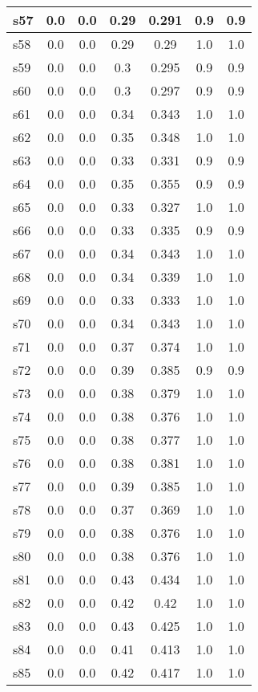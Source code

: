 \documentclass{article}
\begin{document}
\begin{tabular}{|l|c|c|c|c|c|c|}
\hline
s57 &0.0 & 0.0 & 0.29 & 0.291 & 0.9 & 0.9\\
\hline
s58 &0.0 & 0.0 & 0.29 & 0.29 & 1.0 & 1.0\\
\hline
s59 &0.0 & 0.0 & 0.3 & 0.295 & 0.9 & 0.9\\
\hline
s60 &0.0 & 0.0 & 0.3 & 0.297 & 0.9 & 0.9\\
\hline
s61 &0.0 & 0.0 & 0.34 & 0.343 & 1.0 & 1.0\\
\hline
s62 &0.0 & 0.0 & 0.35 & 0.348 & 1.0 & 1.0\\
\hline
s63 &0.0 & 0.0 & 0.33 & 0.331 & 0.9 & 0.9\\
\hline
s64 &0.0 & 0.0 & 0.35 & 0.355 & 0.9 & 0.9\\
\hline
s65 &0.0 & 0.0 & 0.33 & 0.327 & 1.0 & 1.0\\
\hline
s66 &0.0 & 0.0 & 0.33 & 0.335 & 0.9 & 0.9\\
\hline
s67 &0.0 & 0.0 & 0.34 & 0.343 & 1.0 & 1.0\\
\hline
s68 &0.0 & 0.0 & 0.34 & 0.339 & 1.0 & 1.0\\
\hline
s69 &0.0 & 0.0 & 0.33 & 0.333 & 1.0 & 1.0\\
\hline
s70 &0.0 & 0.0 & 0.34 & 0.343 & 1.0 & 1.0\\
\hline
s71 &0.0 & 0.0 & 0.37 & 0.374 & 1.0 & 1.0\\
\hline
s72 &0.0 & 0.0 & 0.39 & 0.385 & 0.9 & 0.9\\
\hline
s73 &0.0 & 0.0 & 0.38 & 0.379 & 1.0 & 1.0\\
\hline
s74 &0.0 & 0.0 & 0.38 & 0.376 & 1.0 & 1.0\\
\hline
s75 &0.0 & 0.0 & 0.38 & 0.377 & 1.0 & 1.0\\
\hline
s76 &0.0 & 0.0 & 0.38 & 0.381 & 1.0 & 1.0\\
\hline
s77 &0.0 & 0.0 & 0.39 & 0.385 & 1.0 & 1.0\\
\hline
s78 &0.0 & 0.0 & 0.37 & 0.369 & 1.0 & 1.0\\
\hline
s79 &0.0 & 0.0 & 0.38 & 0.376 & 1.0 & 1.0\\
\hline
s80 &0.0 & 0.0 & 0.38 & 0.376 & 1.0 & 1.0\\
\hline
s81 &0.0 & 0.0 & 0.43 & 0.434 & 1.0 & 1.0\\
\hline
s82 &0.0 & 0.0 & 0.42 & 0.42 & 1.0 & 1.0\\
\hline
s83 &0.0 & 0.0 & 0.43 & 0.425 & 1.0 & 1.0\\
\hline
s84 &0.0 & 0.0 & 0.41 & 0.413 & 1.0 & 1.0\\
\hline
s85 &0.0 & 0.0 & 0.42 & 0.417 & 1.0 & 1.0\\

\end{tabular}
\end{document}
